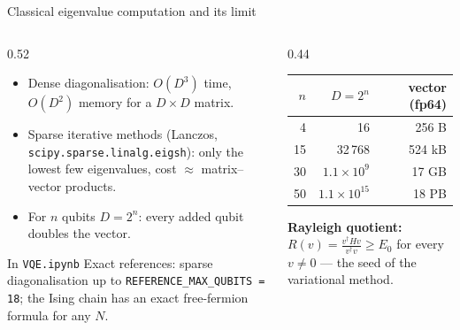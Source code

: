 \documentclass[aspectratio=169,11pt]{beamer}
\newcommand{\key}[1]{{\color{qdark}\textbf{#1}}}
\begin{document}
\begin{frame}{Classical eigenvalue computation and its limit}
  \begin{columns}[T]
    \begin{column}{0.52\textwidth}
      \begin{itemize}
        \item Dense diagonalisation: $O(D^3)$ time, $O(D^2)$ memory for a $D\times D$ matrix.
        \item Sparse iterative methods (Lanczos, \texttt{scipy.sparse.linalg.eigsh}): only the lowest few eigenvalues, cost $\approx$ matrix--vector products.
        \item For $n$ qubits $D = 2^n$: every added qubit doubles the vector.
      \end{itemize}
      \begin{block}{In \texttt{VQE.ipynb}}
        Exact references: sparse diagonalisation up to \texttt{REFERENCE\_MAX\_QUBITS = 18}; the Ising chain has an exact free-fermion
        formula for any $N$.
      \end{block}
    \end{column}
    \begin{column}{0.44\textwidth}
      \small
      \begin{center}
      \begin{tabular}{rrr}
        \toprule $n$ & $D = 2^n$ & vector (fp64)\\ \midrule
        4 & 16 & 256 B\\ 15 & 32\,768 & 524 kB\\ 30 & $1.1\times10^9$ & 17 GB\\ 50 & $1.1\times10^{15}$ & 18 PB\\ \bottomrule
      \end{tabular}
      \end{center}
      \key{Rayleigh quotient:} $R(v) = \frac{v^\dagger Hv}{v^\dagger v} \ge E_0$ for every $v \ne 0$ --- the seed of the variational method.
    \end{column}
  \end{columns}
\end{frame}

\end{document}
